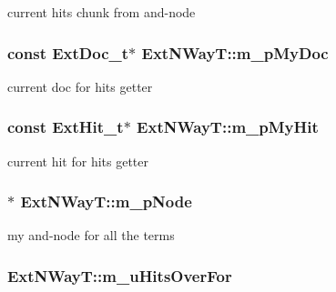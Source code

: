 current hits chunk from and-\/node 

\hypertarget{classExtNWayT_a884e4d44222ebfa66f6f91da110a853d}{
\subsubsection[{m\-\_\-p\-My\-Doc}]{\setlength{\rightskip}{0pt plus 5cm}const {\bf Ext\-Doc\-\_\-t}$\ast$ Ext\-N\-Way\-T\-::m\-\_\-p\-My\-Doc\hspace{0.3cm}{\ttfamily [protected]}}}\label{classExtNWayT_a884e4d44222ebfa66f6f91da110a853d}


current doc for hits getter 

\hypertarget{classExtNWayT_aa4353d3f8c4cdfbd72f58d86ea714882}{
\subsubsection[{m\-\_\-p\-My\-Hit}]{\setlength{\rightskip}{0pt plus 5cm}const {\bf Ext\-Hit\-\_\-t}$\ast$ Ext\-N\-Way\-T\-::m\-\_\-p\-My\-Hit\hspace{0.3cm}{\ttfamily [protected]}}}\label{classExtNWayT_aa4353d3f8c4cdfbd72f58d86ea714882}


current hit for hits getter 

\hypertarget{classExtNWayT_a7d217596cb08caafd98d8906ad121403}{
\subsubsection[{m\-\_\-p\-Node}]{$\ast$ Ext\-N\-Way\-T\-::m\-\_\-p\-Node\hspace{0.3cm}{\ttfamily [protected]}}}\label{classExtNWayT_a7d217596cb08caafd98d8906ad121403}


my and-\/node for all the terms 

\hypertarget{classExtNWayT_a1e61aa842a09f843fff56f95f5618cc1}{
\subsubsection[{m\-\_\-u\-Hits\-Over\-For}]{ Ext\-N\-Way\-T\-::m\-\_\-u\-Hits\-Over\-For\hspace{0.3cm}{\ttfamily [protected]}}}\label{classExtNWayT_a1e61aa842a09f843fff56f95f5618cc1}


